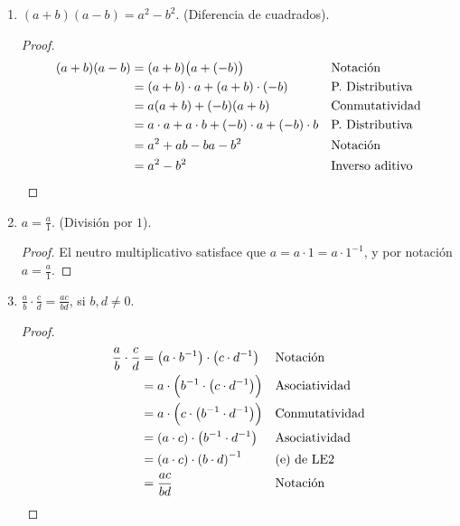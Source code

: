 \documentclass[11pt]{article}
\begin{document}
\begin{enumerate}[label=\alph*)]
    \item $(a+b)(a-b)=a^2-b^2$. (Diferencia de cuadrados).
    \vspace{-1em}\begin{proof} 
        \begin{align*}
        (a+b)(a-b) &= (a+b)\bigl(a+(-b)\bigr) && \text{Notación}\\
        &= (a+b)\cdot a + (a+b)\cdot (-b) && \text{P. Distributiva}\\
        &= a(a+b) + (-b)(a+b) && \text{Conmutatividad}\\
        &= a\cdot a + a\cdot b + (-b)\cdot a + (-b) \cdot b && \text{P. Distributiva}\\
        &= a^2+ ab -ba -b^2 && \text{Notación}\\
        &=a^2-b^2 && \text{Inverso aditivo} \qedhere
        \end{align*}    
    \end{proof} \vspace{-1em}

    \item $a=\frac{a}{1}$. (División por $1$).
    \vspace{-1em}\begin{proof} 
        El neutro multiplicativo satisface que $a=a\cdot 1=a\cdot 1^{-1}$, y por notación $a=\frac{a}{1}$.
    \end{proof} \vspace{-1em}

\pagebreak

    \item $\frac{a}{b} \cdot \frac{c}{d} = \frac{ac}{bd}$, si $b, d \neq 0$.
    \vspace{-1em}\begin{proof} 
        \begin{align*}
            \frac{a}{b} \cdot \frac{c}{d} &= \left( a \cdot b^{-1} \right) \cdot \left( c \cdot d^{-1} \right) && \text{Notación}\\
                &= a \cdot \Bigl( b^{-1} \cdot \left( c \cdot d^{-1} \right) \Bigr) && \text{Asociatividad}\\
                    &= a \cdot \Bigl( c \cdot \left( b^{-1} \cdot d^{-1} \right) \Bigr) && \text{Conmutatividad}\\
            &= \left( a \cdot c \right) \cdot \left( b^{-1} \cdot d^{-1} \right) && \text{Asociatividad}\\
            &= \left( a \cdot c \right) \cdot \left( b \cdot d \right)^{-1} && \text{(e) de LE2}\\
            &= \frac{ac}{bd} && \text{Notación} \qedhere
        \end{align*}    
    \end{proof} \vspace{-1em}


\end{enumerate}
\end{document}
